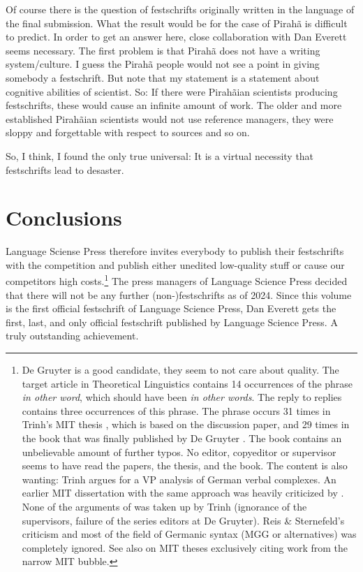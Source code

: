 \documentclass[output=paper,colorlinks,citecolor=brown]{langscibook}
\begin{document}
Of course there is the question of festschrifts originally written in the language of the final
submission. What the result would be for the case of Pirahã is difficult to predict. In order to get
an answer here, close collaboration with Dan Everett seems necessary. The first problem is that
Pirahã does not have a writing system/culture. I guess the Pirahã people would not see a point in giving
somebody a festschrift. But note that my statement is a statement about cognitive abilities of
scientist. So: If there were Pirahãian scientists producing festschrifts, these would cause an
infinite amount of work. The older and more established Pirahãian scientists would not use reference
managers, they were sloppy and forgettable with respect to sources and so on.

So, I think, I found the only true universal: It is a virtual necessity that fest\-schrifts lead to
desaster.

\section{Conclusions}

Language Sciense Press therefore invites everybody to publish their festschrifts with the
competition and publish either unedited low-quality stuff or cause our competitors high
costs.\footnote{
  De Gruyter is a good candidate, they seem to not care about quality. The target article
  \citet{Trinh2009a-u} in Theoretical Linguistics contains 14 occurrences of the phrase \emph{in
    other word}, which should have been \emph{in other words}. The reply to replies
  \citep{Trinh2010a-u} contains three occurrences of this phrase. The phrase occurs 31 times in
  Trinh's MIT thesis \citeyearpar{Trinh2011a}, which is based on the discussion paper, and 29 times in the book that was finally published by De Gruyter
  \citep{Trinh2019a}. The book contains an unbelievable amount of further typos. No editor, copyeditor or
  supervisor seems to have read the papers, the thesis, and the book. The content is also wanting:
  Trinh argues for a VP analysis of German verbal complexes. An earlier MIT dissertation with the
  same approach was heavily criticized by \citet{ReisSternefeld2004}. None of the arguments of \citeauthor{ReisSternefeld2004} was taken up by Trinh (ignorance of the supervisors, failure of the series editors
  at De Gruyter). Reis \& Sternefeld's criticism and most of the field of Germanic syntax
  (MGG or alternatives) was completely ignored. See also \citet[]{ReisSternefeld2004} on
  MIT theses exclusively citing work from the narrow MIT bubble.
}
The press managers of Language Science Press decided that there will not be any further
(non-)festschrifts as of 2024. Since this volume is the first official festschrift of Language
Science Press, Dan Everett gets the first, last, and only official festschrift published by Language
Science Press. A truly outstanding achievement. 
\end{document}
